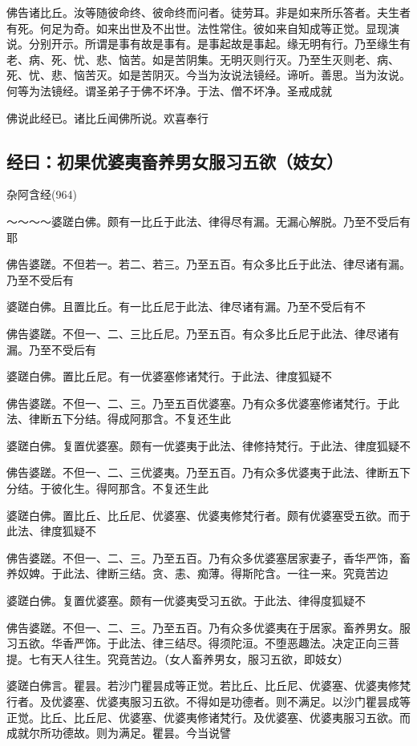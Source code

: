 \documentclass{book}
\begin{document}
佛告诸比丘。汝等随彼命终、彼命终而问者。徒劳耳。非是如来所乐答者。夫生者有死。何足为奇。如来出世及不出世。法性常住。彼如来自知成等正觉。显现演说。分别开示。所谓是事有故是事有。是事起故是事起。缘无明有行。乃至缘生有老、病、死、忧、悲、恼苦。如是苦阴集。无明灭则行灭。乃至生灭则老、病、死、忧、悲、恼苦灭。如是苦阴灭。今当为汝说法镜经。谛听。善思。当为汝说。何等为法镜经。谓圣弟子于佛不坏净。于法、僧不坏净。圣戒成就

佛说此经已。诸比丘闻佛所说。欢喜奉行

\subsection{经曰：初果优婆夷畜养男女服习五欲（妓女）}

杂阿含经(964)

～～～～婆蹉白佛。颇有一比丘于此法、律得尽有漏。无漏心解脱。乃至不受后有耶

佛告婆蹉。不但若一。若二、若三。乃至五百。有众多比丘于此法、律尽诸有漏。乃至不受后有

婆蹉白佛。且置比丘。有一比丘尼于此法、律尽诸有漏。乃至不受后有不

佛告婆蹉。不但一、二、三比丘尼。乃至五百。有众多比丘尼于此法、律尽诸有漏。乃至不受后有

婆蹉白佛。置比丘尼。有一优婆塞修诸梵行。于此法、律度狐疑不

佛告婆蹉。不但一、二、三。乃至五百优婆塞。乃有众多优婆塞修诸梵行。于此法、律断五下分结。得成阿那含。不复还生此

婆蹉白佛。复置优婆塞。颇有一优婆夷于此法、律修持梵行。于此法、律度狐疑不

佛告婆蹉。不但一、二、三优婆夷。乃至五百。乃有众多优婆夷于此法、律断五下分结。于彼化生。得阿那含。不复还生此

婆蹉白佛。置比丘、比丘尼、优婆塞、优婆夷修梵行者。颇有优婆塞受五欲。而于此法、律度狐疑不

佛告婆蹉。不但一、二、三。乃至五百。乃有众多优婆塞居家妻子，香华严饰，畜养奴婢。于此法、律断三结。贪、恚、痴薄。得斯陀含。一往一来。究竟苦边

婆蹉白佛。复置优婆塞。颇有一优婆夷受习五欲。于此法、律得度狐疑不

佛告婆蹉。不但一、二、三。乃至五百。乃有众多优婆夷在于居家。畜养男女。服习五欲。华香严饰。于此法、律三结尽。得须陀洹。不堕恶趣法。决定正向三菩提。七有天人往生。究竟苦边。（女人畜养男女，服习五欲，即妓女）

婆蹉白佛言。瞿昙。若沙门瞿昙成等正觉。若比丘、比丘尼、优婆塞、优婆夷修梵行者。及优婆塞、优婆夷服习五欲。不得如是功德者。则不满足。以沙门瞿昙成等正觉。比丘、比丘尼、优婆塞、优婆夷修诸梵行。及优婆塞、优婆夷服习五欲。而成就尔所功德故。则为满足。瞿昙。今当说譬
\end{document}
